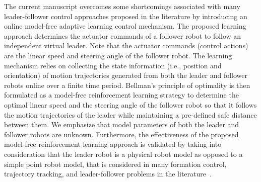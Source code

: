 \documentclass[letterpaper]{article} %
\begin{document}
The current manuscript overcomes some shortcomings associated with many leader-follower control approaches proposed in the literature by introducing an online model-free adaptive learning control mechanism. The proposed learning approach determines the actuator commands of a follower robot to follow an independent virtual leader. Note that the actuator commands (control actions) are the linear speed and steering angle of the follower robot. The learning mechanism relies on collecting the state information (i.e., position and orientation) of motion trajectories generated from both the leader and follower robots online over a finite time period. Bellman's principle of optimality is then formulated as a model-free reinforcement learning strategy to determine the optimal linear speed and the steering angle of the follower robot so that it follows the motion trajectories of the leader while maintaining a pre-defined safe distance between them. We emphasize that model parameters of both the leader and follower robots are unknown. Furthermore, the effectiveness of the proposed model-free reinforcement learning approach is validated by taking into consideration that the leader robot is a physical robot model as opposed to a simple point robot model, that is considered in many formation control, trajectory tracking, and leader-follower problems in the literature~\cite{Marshall2004}. 


\end{document}
